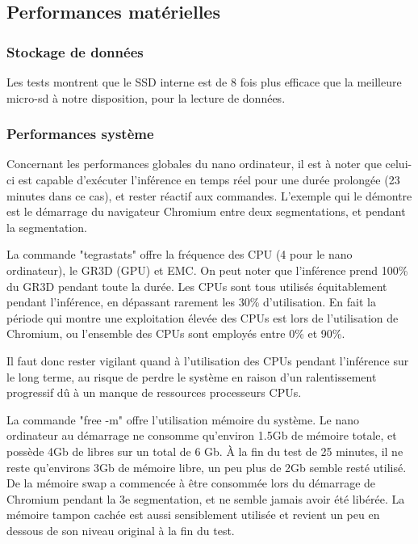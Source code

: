 ﻿\subsection{Performances matérielles}
\subsubsection{Stockage de données}
\par Les tests montrent que le SSD interne est de 8 fois plus efficace que la meilleure micro-sd à notre disposition, pour la lecture de données. 
\subsubsection{Performances système}
\par Concernant les performances globales du nano ordinateur, il est à noter que celui-ci est capable d'exécuter l'inférence en temps réel pour une durée prolongée (23 minutes dans ce cas), et rester réactif aux commandes. L'exemple qui le démontre est le démarrage du navigateur Chromium entre deux segmentations, et pendant la segmentation.
\par La commande "tegrastats" offre la fréquence des CPU (4 pour le nano ordinateur), le GR3D (GPU) et EMC. On peut noter que l'inférence prend 100\% du GR3D pendant toute la durée. Les CPUs sont tous utilisés équitablement pendant l'inférence, en dépassant rarement les 30\% d'utilisation. En fait la période qui montre une exploitation élevée des CPUs est lors de l'utilisation de Chromium, ou l'ensemble des CPUs sont employés entre 0\% et 90\%. 
\par Il faut donc rester vigilant quand à l'utilisation des CPUs pendant l'inférence sur le long terme, au risque de perdre le système en raison d'un ralentissement progressif dû à un manque de ressources processeurs CPUs.
\par La commande "free -m" offre l'utilisation mémoire du système. Le nano ordinateur au démarrage ne consomme qu'environ 1.5Gb de mémoire totale, et possède 4Gb de libres sur un total de 6 Gb. À la fin du test de 25 minutes, il ne reste qu'environs 3Gb de mémoire libre, un peu plus de 2Gb semble resté utilisé. De la mémoire swap a commencée à être consommée lors du démarrage de Chromium pendant la 3e segmentation, et ne semble jamais avoir été libérée. La mémoire tampon cachée est aussi sensiblement utilisée et revient un peu en dessous de son niveau original à la fin du test. 

